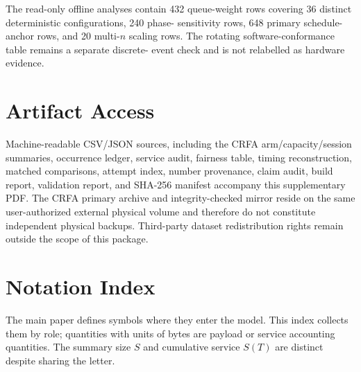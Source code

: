 \documentclass[10pt,onecolumn]{IEEEtran}
\begin{document}
The read-only offline analyses contain 432 queue-weight rows covering 36
distinct deterministic configurations, 240 phase-
sensitivity rows, 648 primary schedule-anchor rows, and 20 multi-$n$ scaling
rows. The rotating software-conformance table remains a separate discrete-
event check and is not relabelled as hardware evidence.

\section{Artifact Access}
Machine-readable CSV/JSON sources, including the CRFA arm/capacity/session
summaries, occurrence ledger, service audit, fairness table, timing
reconstruction, matched comparisons, attempt index, number provenance, claim
audit, build report, validation report, and SHA-256 manifest accompany this
supplementary PDF. The CRFA primary archive and integrity-checked mirror reside
on the same user-authorized external physical volume and therefore do not
constitute independent physical backups. Third-party dataset redistribution
rights remain outside the scope of this package.

\clearpage
\section{Notation Index}
\label{sec:supp_notation}
The main paper defines symbols where they enter the model. This index
collects them by role; quantities with units of bytes are payload or service
accounting quantities. The summary size $S$ and cumulative service $S(T)$
are distinct despite sharing the letter.
\end{document}
